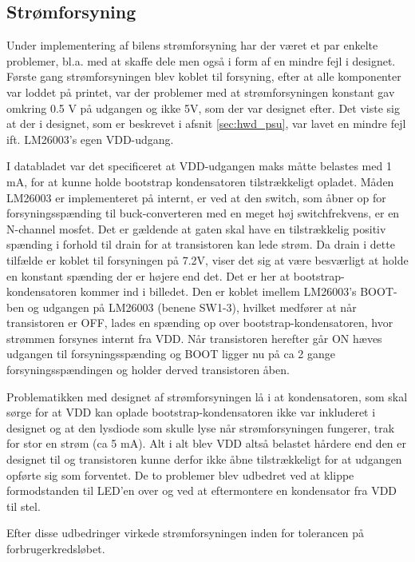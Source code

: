 \subsection{Strømforsyning}

Under implementering af bilens strømforsyning har der været et par enkelte problemer, bl.a. med at skaffe dele men også i form af en mindre fejl i designet.
Første gang strømforsyningen blev koblet til forsyning, efter at alle komponenter var loddet på printet, var der problemer med at strømforsyningen konstant gav omkring 0.5 V på udgangen og ikke 5V, som der var designet efter.
Det viste sig at der i designet, som er beskrevet i afsnit \ref{sec:hwd_psu}, var lavet en mindre fejl ift. LM26003's egen VDD-udgang.

I databladet var det specificeret at VDD-udgangen maks måtte belastes med 1 mA, for at kunne holde bootstrap kondensatoren tilstrækkeligt opladet.
Måden LM26003 er implementeret på internt, er ved at den switch, som åbner op for forsyningsspænding til buck-converteren med en meget høj switchfrekvens, er en N-channel mosfet.
Det er gældende at gaten skal have en tilstrækkelig positiv spænding i forhold til drain for at transistoren kan lede strøm. 
Da drain i dette tilfælde er koblet til forsyningen på 7.2V, viser det sig at være besværligt at holde en konstant spænding der er højere end det.
Det er her at bootstrap-kondensatoren kommer ind i billedet.
Den er koblet imellem LM26003's BOOT-ben og udgangen på LM26003 (benene SW1-3), hvilket medfører at når transistoren er OFF, lades en spænding op over bootstrap-kondensatoren, hvor strømmen forsynes internt fra VDD.
Når transistoren herefter går ON hæves udgangen til forsyningsspænding og BOOT ligger nu på ca 2 gange forsyningsspændingen og holder derved transistoren åben.

Problematikken med designet af strømforsyningen lå i at kondensatoren, som skal sørge for at VDD kan oplade bootstrap-kondensatoren ikke var inkluderet i designet og at den lysdiode som skulle lyse når strømforsyningen fungerer, trak for stor en strøm (ca 5 mA).
Alt i alt blev VDD altså belastet hårdere end den er designet til og transistoren kunne derfor ikke åbne tilstrækkeligt for at udgangen opførte sig som forventet.
De to problemer blev udbedret ved at klippe formodstanden til LED'en over og ved at eftermontere en kondensator fra VDD til stel.

Efter disse udbedringer virkede strømforsyningen inden for tolerancen på forbrugerkredsløbet. 


